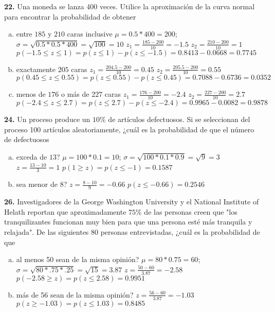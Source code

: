 \documentclass[12pt, letterpaper]{article}
\begin{document}
    \textbf{22. }Una moneda se lanza 400 veces. Utilice la aproximación de la curva normal para encontrar la probabilidad
    de obtener
        \begin{enumerate}[a)]
            \item entre $185$ y $210$ caras inclusive\vskip0.5cm
                $\mu=0.5*400=200$; $\sigma=\sqrt{0.5*0.5*400}=\sqrt{100}=10$\vskip0.5cm
                $z_1=\displaystyle\frac{185-200}{10}=-1.5$\vskip0.5cm
                $z_2=\displaystyle\frac{210-200}{10}=1$\vskip0.5cm
                $p(-1.5\leq z\leq 1)=p(z\leq 1)-p(z\leq -1.5)=0.8413-0.0668=0.7745$
            \item exactamente $205$ caras\vskip0.5cm
                $z_1=\displaystyle\frac{204.5-200}{10}=0.45$\vskip0.5cm
                $z_2=\displaystyle\frac{205.5-200}{10}=0.55$\vskip0.5cm
                $p(0.45\leq z\leq 0.55)=p(z\leq 0.55)-p(z\leq 0.45)=0.7088-0.6736=0.0352$
            \item menos de $176$ o más de $227$ caras\vskip0.5cm
                $z_1=\displaystyle\frac{176-200}{10}=-2.4$\vskip0.5cm
                $z_2=\displaystyle\frac{227-200}{10}=2.7$\vskip0.5cm
                $p(-2.4\leq z\leq 2.7)=p(z\leq 2.7)-p(z\leq -2.4)=0.9965-0.0082=0.9878$
        \end{enumerate}\vskip1cm

    \textbf{24. }Un proceso produce un $10\%$ de artículos defectuosos. Si se seleccionan del proceso 100 artículos
    aleatoriamente, ¿cuál es la probabilidad de que el número de defectuosos
        \begin{enumerate}[a)]
            \item exceda de $13$?\vskip0.5cm
                $\mu = 100*0.1=10$; $\sigma = \sqrt{100*0.1*0.9}=\sqrt{9}=3$\vskip0.5cm
                $z=\displaystyle\frac{13-10}{3}=1$\vskip0.5cm
                $p(1\geq z)=p(z\leq -1)=0.1587$
            \item sea menor de $8$?\vskip0.5cm
                $z=\displaystyle\frac{8-10}{9}=-0.66$\vskip0.5cm
                $p(z\leq -0.66)=0.2546$
        \end{enumerate}\vskip1cm

    \textbf{26. }Investigadores de la George Washington University y el National Institute of Helath reportan que
    aproximadamente $75\%$ de las personas creen que "los tranquilizantes funcionan muy bien para que una persona esté
    más tranquila y relajada". De las siguientes 80 personas entrevistadas, ¿cuál es la probabilidad de que
        \begin{enumerate}[a)]
            \item al menos 50 sean de la misma opinión?\vskip0.5cm
                $\mu = 80*0.75=60$; $\sigma = \sqrt{80*.75*.25}=\sqrt{15}=3.87$\vskip0.5cm
                $z=\displaystyle\frac{50-60}{3.87}=-2.58$\vskip0.5cm
                $p(-2.58\geq z)=p(z\leq 2.58)=0.9951$\vskip0.5cm
            \item más de 56 sean de la misma opinión?\vskip0.5cm
                $z=\displaystyle\frac{56-60}{3.87}=-1.03$\vskip0.5cm
                $p(z\geq -1.03)=p(z\leq 1.03)=0.8485$
        \end{enumerate}\vskip1cm
\end{document}
